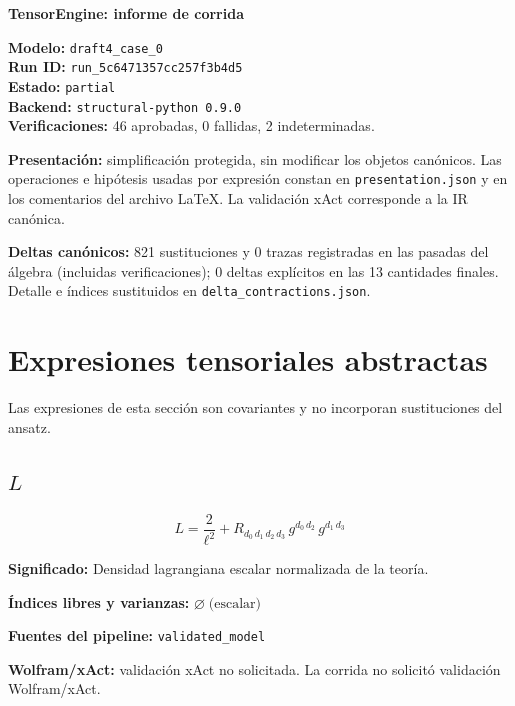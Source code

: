 \documentclass[11pt]{article}
\begin{document}
\begin{center}
{\Large\bfseries TensorEngine: informe de corrida}
\end{center}
\textbf{Modelo:} \texttt{draft4\_case\_0}\\
\textbf{Run ID:} \texttt{run\_5c6471357cc257f3b4d5}\\
\textbf{Estado:} \texttt{partial}\\
\textbf{Backend:} \texttt{structural-python 0.9.0}\\
\textbf{Verificaciones:} 46 aprobadas, 0 fallidas, 2 indeterminadas.
\par\smallskip
\textbf{Presentación:} simplificación protegida, sin modificar los objetos canónicos. Las operaciones e hipótesis usadas por expresión constan en \texttt{presentation.json} y en los comentarios del archivo LaTeX. La validación xAct corresponde a la IR canónica.\par
\textbf{Deltas canónicos:} 821 sustituciones y 0 trazas registradas en las pasadas del álgebra (incluidas verificaciones); 0 deltas explícitos en las 13 cantidades finales. Detalle e índices sustituidos en \texttt{delta\_contractions.json}.\par
\section*{Expresiones tensoriales abstractas}
Las expresiones de esta sección son covariantes y no incorporan sustituciones del ansatz.
\subsection*{$ L $}
\begin{dmath*}[breakdepth={5}]
L = \frac{2}{{\ell}^{2}} + R{}_{d_{0}\,d_{1}\,d_{2}\,d_{3}}\,g{}^{d_{0}\,d_{2}}\,g{}^{d_{1}\,d_{3}}
\end{dmath*}
\par\vspace{1.2\baselineskip}\noindent
\begin{minipage}{\linewidth}
\textbf{Significado:} Densidad lagrangiana escalar normalizada de la teoría.\par
\textbf{Índices libres y varianzas:} $ \varnothing\;\text{(escalar)} $\par
\textbf{Fuentes del pipeline:} \texttt{validated\_model}\par
\textbf{Wolfram/xAct:} validación xAct no solicitada. La corrida no solicitó validación Wolfram/xAct.\par
\end{minipage}
\end{document}
